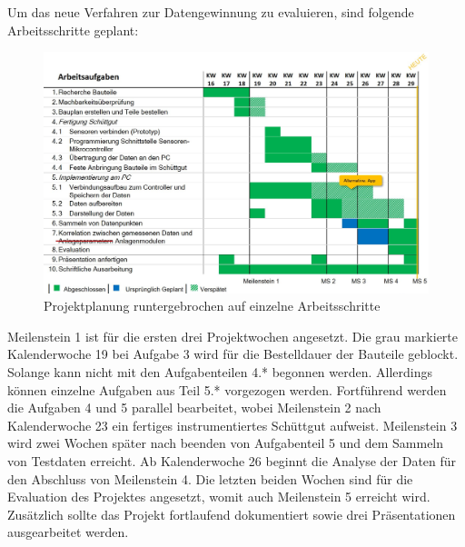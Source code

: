 Um das neue Verfahren zur Datengewinnung zu evaluieren, sind folgende Arbeitsschritte geplant: \newpage

\begin{figure}[ht]
	\centering
	\includegraphics[width=1\textwidth]{images/k2-projektplan.JPG}
	\caption {Projektplanung runtergebrochen auf einzelne Arbeitsschritte}
	\label{fig:k2}
\end{figure}

Meilenstein 1 ist für die ersten drei Projektwochen angesetzt. Die grau markierte Kalenderwoche 19 bei Aufgabe 3 wird für die Bestelldauer der Bauteile geblockt. Solange kann nicht mit den Aufgabenteilen 4.* begonnen werden. Allerdings können einzelne Aufgaben aus Teil 5.* vorgezogen werden. Fortführend werden die Aufgaben 4 und 5 parallel bearbeitet, wobei Meilenstein 2 nach Kalenderwoche 23 ein fertiges instrumentiertes Schüttgut aufweist. Meilenstein 3 wird zwei Wochen später nach beenden von Aufgabenteil 5 und dem Sammeln von Testdaten erreicht. Ab Kalenderwoche 26 beginnt die Analyse der Daten für den Abschluss von Meilenstein 4. Die letzten beiden Wochen sind für die Evaluation des Projektes angesetzt, womit auch Meilenstein 5 erreicht wird. Zusätzlich sollte das Projekt fortlaufend dokumentiert sowie drei Präsentationen ausgearbeitet werden.